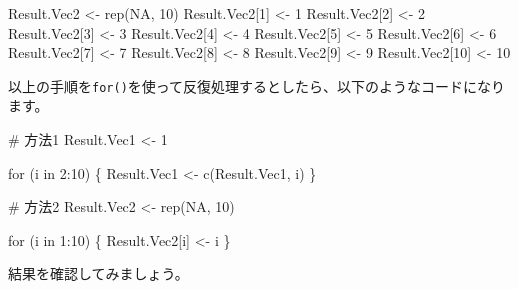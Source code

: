 \documentclass[
  a4paper,
  pandoc,
  ja=standard,
  jafont=haranoaji]{bxjsbook}
\newenvironment{Shaded}{\begin{snugshade}}{\end{snugshade}}
\newcommand{\CommentTok}[1]{\textcolor[rgb]{0.37,0.37,0.37}{#1}}
\newcommand{\ConstantTok}[1]{\textcolor[rgb]{0.56,0.35,0.01}{#1}}
\newcommand{\ControlFlowTok}[1]{\textcolor[rgb]{0.00,0.48,0.65}{#1}}
\newcommand{\DecValTok}[1]{\textcolor[rgb]{0.68,0.00,0.00}{#1}}
\newcommand{\FunctionTok}[1]{\textcolor[rgb]{0.28,0.35,0.67}{#1}}
\newcommand{\NormalTok}[1]{\textcolor[rgb]{0.00,0.48,0.65}{#1}}
\newcommand{\OtherTok}[1]{\textcolor[rgb]{0.00,0.48,0.65}{#1}}
\newcommand{\SpecialCharTok}[1]{\textcolor[rgb]{0.37,0.37,0.37}{#1}}
\begin{document}
\begin{Shaded}
\begin{Highlighting}[numbers=left,,]
\NormalTok{Result.Vec2     }\OtherTok{\textless{}{-}} \FunctionTok{rep}\NormalTok{(}\ConstantTok{NA}\NormalTok{, }\DecValTok{10}\NormalTok{)}
\NormalTok{Result.Vec2[}\DecValTok{1}\NormalTok{]  }\OtherTok{\textless{}{-}} \DecValTok{1}
\NormalTok{Result.Vec2[}\DecValTok{2}\NormalTok{]  }\OtherTok{\textless{}{-}} \DecValTok{2}
\NormalTok{Result.Vec2[}\DecValTok{3}\NormalTok{]  }\OtherTok{\textless{}{-}} \DecValTok{3}
\NormalTok{Result.Vec2[}\DecValTok{4}\NormalTok{]  }\OtherTok{\textless{}{-}} \DecValTok{4}
\NormalTok{Result.Vec2[}\DecValTok{5}\NormalTok{]  }\OtherTok{\textless{}{-}} \DecValTok{5}
\NormalTok{Result.Vec2[}\DecValTok{6}\NormalTok{]  }\OtherTok{\textless{}{-}} \DecValTok{6}
\NormalTok{Result.Vec2[}\DecValTok{7}\NormalTok{]  }\OtherTok{\textless{}{-}} \DecValTok{7}
\NormalTok{Result.Vec2[}\DecValTok{8}\NormalTok{]  }\OtherTok{\textless{}{-}} \DecValTok{8}
\NormalTok{Result.Vec2[}\DecValTok{9}\NormalTok{]  }\OtherTok{\textless{}{-}} \DecValTok{9}
\NormalTok{Result.Vec2[}\DecValTok{10}\NormalTok{] }\OtherTok{\textless{}{-}} \DecValTok{10}
\end{Highlighting}
\end{Shaded}

以上の手順を\texttt{for()}を使って反復処理するとしたら、以下のようなコードになります。

\begin{Shaded}
\begin{Highlighting}[numbers=left,,]
\CommentTok{\# 方法1}
\NormalTok{Result.Vec1 }\OtherTok{\textless{}{-}} \DecValTok{1}

\ControlFlowTok{for}\NormalTok{ (i }\ControlFlowTok{in} \DecValTok{2}\SpecialCharTok{:}\DecValTok{10}\NormalTok{) \{}
\NormalTok{    Result.Vec1 }\OtherTok{\textless{}{-}} \FunctionTok{c}\NormalTok{(Result.Vec1, i)}
\NormalTok{\}}

\CommentTok{\# 方法2}
\NormalTok{Result.Vec2 }\OtherTok{\textless{}{-}} \FunctionTok{rep}\NormalTok{(}\ConstantTok{NA}\NormalTok{, }\DecValTok{10}\NormalTok{)}

\ControlFlowTok{for}\NormalTok{ (i }\ControlFlowTok{in} \DecValTok{1}\SpecialCharTok{:}\DecValTok{10}\NormalTok{) \{}
\NormalTok{    Result.Vec2[i] }\OtherTok{\textless{}{-}}\NormalTok{ i}
\NormalTok{\}}
\end{Highlighting}
\end{Shaded}

結果を確認してみましょう。
\end{document}
